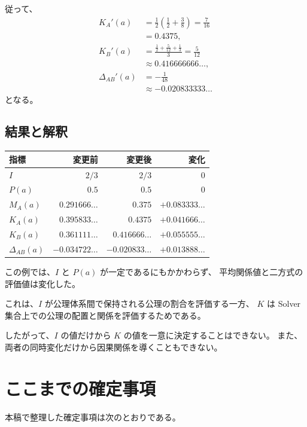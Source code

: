 \documentclass[a4paper,11pt]{ltjsarticle}
\begin{document}
従って、
\begin{align}
  K_A'(a)
  &=\frac12\left(\frac12+\frac38\right)
    =\frac7{16}\\
  &=0.4375,\\
  K_B'(a)
  &=\frac{\frac12+\frac5{12}+\frac13}{3}
    =\frac5{12}\\
  &\approx0.416666666\ldots,\\
  \Delta_{AB}'(a)
  &=-\frac1{48}\\
  &\approx-0.020833333\ldots
\end{align}
となる。

\subsection{結果と解釈}

\begin{center}
\begin{tabular}{lrrr}
\toprule
指標 & 変更前 & 変更後 & 変化\\
\midrule
$I$ & $2/3$ & $2/3$ & $0$\\
$P(a)$ & $0.5$ & $0.5$ & $0$\\
$M_A(a)$ & $0.291666\ldots$ & $0.375$ & $+0.083333\ldots$\\
$K_A(a)$ & $0.395833\ldots$ & $0.4375$ & $+0.041666\ldots$\\
$K_B(a)$ & $0.361111\ldots$ & $0.416666\ldots$ & $+0.055555\ldots$\\
$\Delta_{AB}(a)$ & $-0.034722\ldots$ & $-0.020833\ldots$ & $+0.013888\ldots$\\
\bottomrule
\end{tabular}
\end{center}

この例では、$I$ と $P(a)$ が一定であるにもかかわらず、
平均関係値と二方式の評価値は変化した。

これは、$I$ が公理体系間で保持される公理の割合を評価する一方、
$K$ は Solver 集合上での公理の配置と関係を評価するためである。

したがって、$I$ の値だけから $K$ の値を一意に決定することはできない。
また、両者の同時変化だけから因果関係を導くこともできない。

\section{ここまでの確定事項}

本稿で整理した確定事項は次のとおりである。
\end{document}
